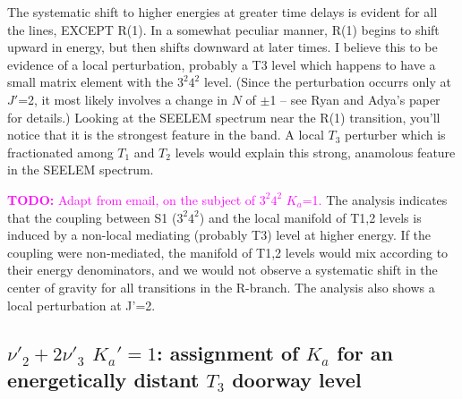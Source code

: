 \documentclass[12pt]{mitthesis}
\newcommand{\TODO} [1]{\textcolor{magenta}{\textbf{TODO:} #1}}
\begin{document}
The systematic shift to higher energies at greater time delays is
evident for all the lines, EXCEPT R(1).  In a somewhat peculiar
manner, R(1) begins to shift upward in energy, but then shifts
downward at later times. I believe this to be evidence of a local
perturbation, probably a T3 level which happens to have a small matrix
element with the $3^2 4^2$ level.  (Since the perturbation occurrs
only at $J'$=2, it most likely involves a change in $N$ of $\pm$1 --
see Ryan and Adya's paper for details.)  Looking at the SEELEM
spectrum near the R(1) transition, you'll notice that it is the
strongest feature in the band.  A local $T_3$ perturber which is
fractionated among $T_1$ and $T_2$ levels would explain this strong,
anamolous feature in the SEELEM spectrum.

\TODO{Adapt from email, on the subject of $3^2 4^2$ $K_a$=1.}  The
analysis indicates that the coupling between S1 ($3^2 4^2$) and the
local manifold of T1,2 levels is induced by a non-local mediating
(probably T3) level at higher energy.  If the coupling were
non-mediated, the manifold of T1,2 levels would mix according to their
energy denominators, and we would not observe a systematic shift in
the center of gravity for all transitions in the R-branch.  The
analysis also shows a local perturbation at J'=2.




\subsection{$\nu'_2+2\nu'_3$ $K_a'\!=\!1$: assignment of $K_a$ for an
  energetically distant $T_3$ doorway level}


\end{document}
